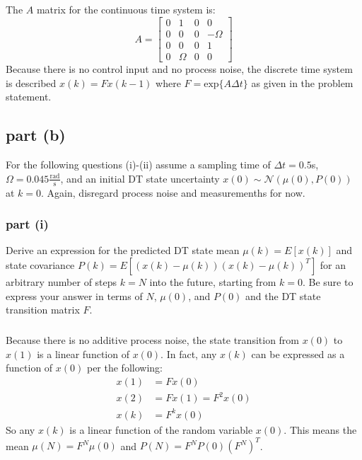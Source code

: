 \documentclass[11pt]{article}
\begin{document}
\subparagraph*{}
The $A$ matrix for the continuous time system is:
\begin{equation*}
	A = \begin{bmatrix} 0 & 1 & 0 & 0 \\
						0 & 0 & 0 & -\Omega \\
						0 & 0 & 0 & 1 \\
						0 & \Omega & 0 & 0 \end{bmatrix}
\end{equation*}
Because there is no control input and no process noise, the discrete time system is described $x(k)=Fx(k-1)$ where $F=\text{exp}\{A\Delta t\}$ as given in the problem statement.


\subsection*{part (b)}
For the following questions (i)-(ii) assume a sampling time of $\Delta t=0.5$s, $\Omega=0.045\frac{\text{rad}}{\text{s}}$, and an initial DT state uncertainty $x(0)\sim\mathcal{N}(\mu(0),P(0))$ at $k=0$. Again, disregard process noise and measuremenths for now.

\subsubsection*{part (i)}
Derive an expression for the predicted DT state mean $\mu(k)=E[x(k)]$ and state covariance $P(k)=E[(x(k)-\mu(k))(x(k)-\mu(k))^T]$ for an arbitrary number of steps $k=N$ into the future, starting from $k=0$. Be sure to express your answer in terms of $N$, $\mu(0)$, and $P(0)$ and the DT state transition matrix $F$.

\subparagraph*{}
Because there is no additive process noise, the state transition from $x(0)$ to $x(1)$ is a linear function of $x(0)$. In fact, any $x(k)$ can be expressed as a function of $x(0)$ per the following:
\begin{align*}
	x(1) &= Fx(0) \\
	x(2) &= Fx(1) = F^2x(0) \\
	x(k) &= F^kx(0)
\end{align*}
So any $x(k)$ is a linear function of the random variable $x(0)$. This means the mean $\mu(N) = F^N\mu(0)$ and $P(N) = F^NP(0)(F^N)^T$. 
\end{document}
